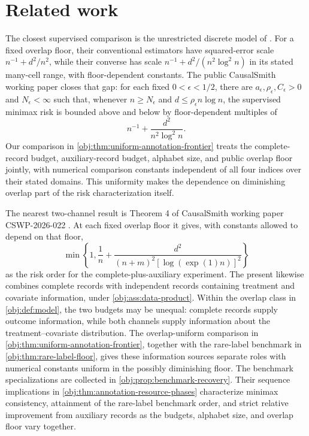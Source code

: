 \section{Related work}

The closest supervised comparison is the unrestricted discrete model of \citet[model (3), Theorems 1--2]{ZengBalakrishnanHanKennedy2026Discrete}. For a fixed overlap floor, their conventional estimators have squared-error scale \(n^{-1}+d^2/n^2\), while their converse has scale \(n^{-1}+d^2/(n^2\log^2 n)\) in its stated many-cell range, with floor-dependent constants. The public CausalSmith working paper \citet[Theorem \texttt{thm:sharp-minimax-fixed-interior}]{InternalDiscreteATEPolynomialUpperMatch} closes that gap: for each fixed \(0<\epsilon<1/2\), there are \(a_\epsilon,\rho_\epsilon,C_\epsilon>0\) and \(N_\epsilon<\infty\) such that, whenever \(n\ge N_\epsilon\) and \(d\le\rho_\epsilon n\log n\), the supervised minimax risk is bounded above and below by floor-dependent multiples of
\[
n^{-1}+\frac{d^2}{n^2\log^2 n}.
\]
Our comparison in \cref{obj:thm:uniform-annotation-frontier} treats the complete-record budget, auxiliary-record budget, alphabet size, and public overlap floor jointly, with numerical comparison constants independent of all four indices over their stated domains. This uniformity makes the dependence on diminishing overlap part of the risk characterization itself.

The nearest two-channel result is Theorem 4 of CausalSmith working paper CSWP-2026-022 \citep{CausalSmith2026Annotation}. At each fixed overlap floor it gives, with constants allowed to depend on that floor,
\[
\min\left\{1,\frac1n+\frac{d^2}{(n+m)^2[\log(\exp(1)n)]^2}\right\}
\]
as the risk order for the complete-plus-auxiliary experiment. The present  likewise combines complete records with independent records containing treatment and covariate information, under \cref{obj:ass:data-product}. Within the overlap class in \cref{obj:def:model}, the two budgets may be unequal: complete records supply outcome information, while both channels supply information about the treatment--covariate distribution. The overlap-uniform comparison in \cref{obj:thm:uniform-annotation-frontier}, together with the rare-label benchmark in \cref{obj:thm:rare-label-floor}, gives these information sources separate roles with numerical constants uniform in the possibly diminishing floor. The benchmark specializations are collected in \cref{obj:prop:benchmark-recovery}. Their sequence implications in \cref{obj:thm:annotation-resource-phases} characterize minimax consistency, attainment of the rare-label benchmark order, and strict relative improvement from auxiliary records as the budgets, alphabet size, and overlap floor vary together.

